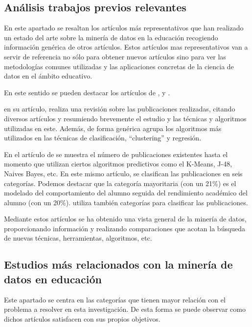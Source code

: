 \subsection{Análisis trabajos previos relevantes}
En este apartado se resaltan los artículos más representativos que han realizado un estado del arte sobre la minería de datos en la educación recogiendo información genérica de otros artículos.  Estos artículos mas representativos van a servir de referencia no sólo para obtener nuevos artículos sino para ver las metodologías comunes utilizadas y las aplicaciones concretas de la ciencia de datos en el ámbito educativo.

En este sentido se pueden destacar los artículos de ,  y .

 en su artículo, realiza una revisión sobre las publicaciones realizadas, citando diversos artículos y resumiendo brevemente el estudio y las técnicas y algoritmos utilizadas en este. Además, de forma genérica agrupa los algoritmos más utilizados en las técnicas de clasificación, ``clustering'' y regresión.

En el artículo de  se muestra el número de publicaciones existentes hasta el momento que utilizan ciertos algoritmos predictivos como el K-Means, J-48, Naives Bayes, etc. En este mismo artículo, se clasifican las publicaciones en seis categorías. Podemos destacar que la categoría mayoritaria (con un 21\%) es el modelado del comportamiento del alumno seguida del rendimiento académico del alumno (con un 20\%).  utiliza también categorías para clasificar las publicaciones.

Mediante estos artículos se ha obtenido una vista general de la minería de datos, proporcionando información y realizando comparaciones que acotan la búsqueda de nuevas técnicas, herramientas, algoritmos, etc.


\subsection{Estudios más relacionados con la minería de datos en educación}
Este apartado se centra en las categorías que tienen mayor relación con el problema a resolver en esta investigación. De esta forma se puede observar como dichos artículos satisfacen con sus propios objetivos.

